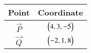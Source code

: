 \begin{tabular}{|c|c|}
   \hline
   Point & Coordinate \\
   \hline
	$\vec{P}$ & $\begin{pmatrix}4,3,-5\end{pmatrix}$ \\
   \hline
	$\vec{Q}$ & $\begin{pmatrix}-2,1,8\end{pmatrix}$ \\
   \hline
\end{tabular}
